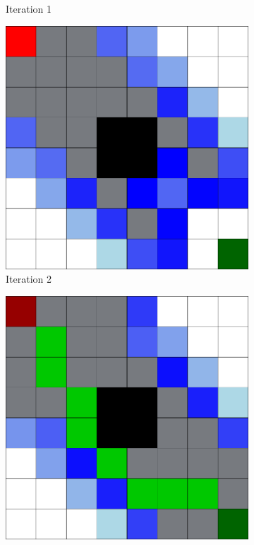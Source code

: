 \begin{figure}[h!]
\begin{subfigure}[b]{0.2\linewidth}
     \caption{Iteration 1}
  \end{subfigure}
  \hfill
  \begin{subfigure}[b]{0.2\linewidth}
    \includegraphics[width=\linewidth]{images/a_star_2.png}
    \caption{Iteration 2}
  \end{subfigure}
  \hfill
  \begin{subfigure}[b]{0.2\linewidth}
    \includegraphics[width=\linewidth]{images/a_star_3.png}

\end{subfigure}
\end{figure}
